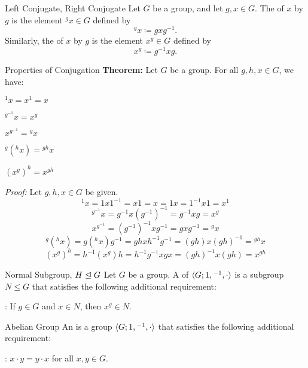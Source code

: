 \documentclass[12pt]{report}
\begin{document}
\begin{dfnbox}{Left Conjugate, Right Conjugate}
	Let $G$ be a group, and let $g, x \in G$. The  of $x$ by $g$ is the element ${}^g x \in G$ defined by
	\[ {}^g x \coloneq g x g^{-1}. \]
	Similarly, the  of $x$ by $g$ is the element $x^g \in G$ defined by
	\[ x^g \coloneq g^{-1} x g. \]
\end{dfnbox}

\begin{thmbox}{Properties of Conjugation}
	\textbf{Theorem:} Let $G$ be a group. For all $g, h, x \in G$, we have:
	\begin{dfnitems}
		\item ${}^1 x = x^1 = x$
		\item ${}^{g^{-1}} x = x^g$
		\item $x^{g^{-1}} = {}^g x$
		\item ${}^{g} ({}^{h} x) = {}^{gh} x$
		\item $(x^g)^h = x^{gh}$
	\end{dfnitems}
\tcblower
	\textit{Proof:} Let $g, h, x \in G$ be given.
	\[ {}^1 x = 1 x 1^{-1} = x1 = x = 1x = 1^{-1} x 1 = x^1 \]
	\[ {}^{g^{-1}} x = g^{-1} x (g^{-1})^{-1} = g^{-1} x g = x^g \]
	\[ x^{g^{-1}} = (g^{-1})^{-1} x g^{-1} = g x g^{-1} = {}^g x \]
	\[ {}^{g} ({}^{h} x) = g ({}^h x) g^{-1} = g h x h^{-1} g^{-1} = (gh) x (gh)^{-1} = {}^{gh} x \]
	\[ (x^g)^h = h^{-1} (x^g) h = h^{-1} g^{-1} x g x = (gh)^{-1} x (gh) = x^{gh} \]
\end{thmbox}

\begin{dfnbox}{Normal Subgroup, $H \trianglelefteq G$}
	Let $G$ be a group. A  of ${\langle {G; 1, {}^{-1}, \cdot} \rangle}$ is a subgroup $N \le G$ that satisfies the following additional requirement:
	\begin{dfnitems}
		\item {}: If $g \in G$ and $x \in N$, then $x^g \in N$.
	\end{dfnitems}
\end{dfnbox}

\begin{dfnbox}{Abelian Group}
	An  is a group ${\langle {G; 1, {}^{-1}, \cdot} \rangle}$ that satisfies the following additional requirement:
	\begin{dfnitems}
		\item {}: $x \cdot y = y \cdot x$ for all $x, y \in G$.
	\end{dfnitems}
\end{dfnbox}
\end{document}
